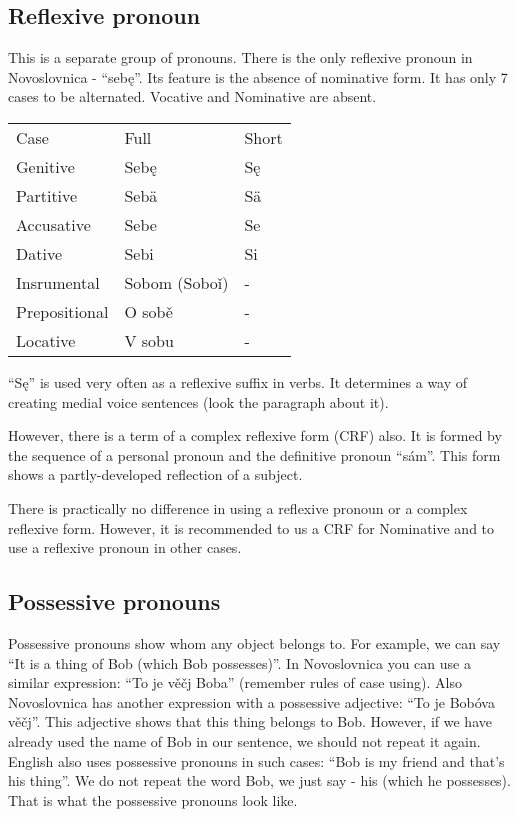 \subsection{Reflexive pronoun}

This is a separate group of pronouns. There is the only reflexive pronoun in Novoslovnica - “sebę”. Its feature is the absence of nominative form. It has only 7 cases to be alternated. Vocative and Nominative are absent.

\begin{table}
	\begin{tabular}{lll}
		Case & Full & Short \\
		Genitive & Sebę & Sę \\
		Partitive & Sebä & Sä \\
		Accusative & Sebe & Se \\
		Dative & Sebi & Si \\ 
		Insrumental & Sobom (Soboǐ) & - \\ 
		Prepositional & O sobě & - \\
		Locative & V sobu & -
	\end{tabular}
\end{table}


“Sę” is used very often as a reflexive suffix in verbs. It determines a way of creating medial voice sentences (look the paragraph about it).

However, there is a term of a complex reflexive form (CRF) also. It is formed by the sequence of a personal pronoun and the definitive pronoun “sám”. This form shows a partly-developed reflection of a subject.  

There is practically no difference in using a reflexive pronoun or a complex reflexive form. However, it is recommended to us a CRF for Nominative and to use a reflexive pronoun in other cases.

\subsection{Possessive pronouns}

Possessive pronouns show whom any object belongs to. For example, we can say “It is a thing of Bob (which Bob possesses)”. In Novoslovnica you can use a similar expression: “To je věčj Boba” (remember rules of case using). Also Novoslovnica has another expression with a possessive adjective: “To je Bobóva věčj”. This adjective shows that this thing belongs to Bob. However, if we have already used the name of Bob in our sentence, we should not repeat it again. English also uses possessive pronouns in such cases: “Bob is my friend and that’s his thing”. We do not repeat the word Bob, we just say - his (which he possesses). That is what the possessive pronouns look like.

